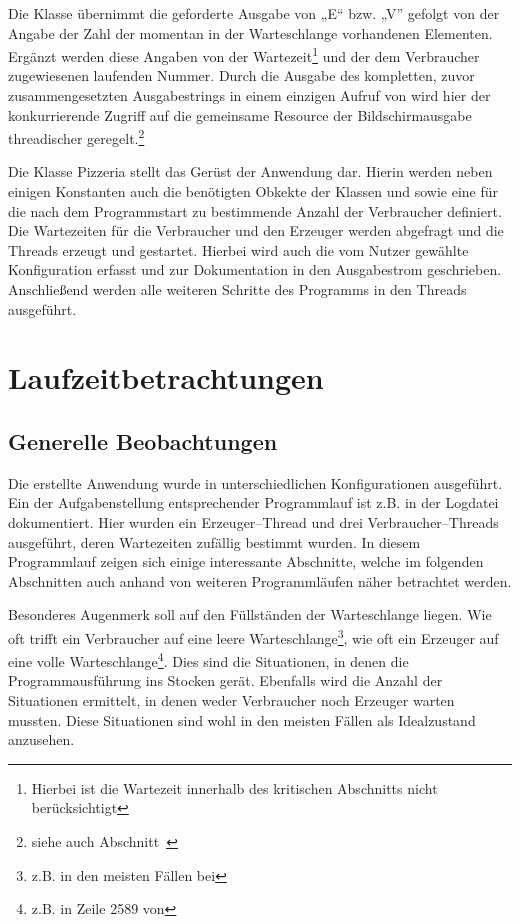 Die Klasse  übernimmt die geforderte Ausgabe von „E“ bzw. „V” gefolgt von der Angabe der Zahl der momentan in der Warteschlange vorhandenen Elementen. Ergänzt werden diese Angaben von der Wartezeit\footnote{Hierbei ist die Wartezeit innerhalb des kritischen Abschnitts nicht berücksichtigt} und der dem Verbraucher zugewiesenen laufenden Nummer. Durch die Ausgabe des kompletten, zuvor zusammengesetzten Ausgabestrings in einem einzigen Aufruf von  wird hier der konkurrierende Zugriff auf die gemeinsame Resource der Bildschirmausgabe threadischer geregelt.\footnote{siehe auch Abschnitt~}

Die Klasse Pizzeria stellt das Gerüst der Anwendung dar. Hierin werden neben einigen Konstanten auch die benötigten Obkekte der Klassen  und  sowie eine  für die nach dem Programmstart zu bestimmende Anzahl der Verbraucher definiert. Die Wartezeiten für die Verbraucher und den Erzeuger werden abgefragt und die Threads erzeugt und gestartet. Hierbei wird auch die vom Nutzer gewählte Konfiguration erfasst und zur Dokumentation in den Ausgabestrom geschrieben. Anschließend werden alle weiteren Schritte des Programms in den Threads ausgeführt. 

\section{Laufzeitbetrachtungen} %
\label{sec:laufzeitbetrachtungen}

\subsection{Generelle Beobachtungen} %
\label{sub:generelle_beobachtungen}
Die erstellte Anwendung wurde in unterschiedlichen Konfigurationen ausgeführt. Ein der Aufgabenstellung entsprechender Programmlauf ist z.B. in der Logdatei  dokumentiert. Hier wurden ein Erzeuger–Thread und drei Verbraucher–Threads ausgeführt, deren Wartezeiten zufällig bestimmt wurden. In diesem Programmlauf zeigen sich einige interessante Abschnitte, welche im folgenden Abschnitten auch anhand von weiteren Programmläufen näher betrachtet werden.

Besonderes Augenmerk soll auf den Füllständen der Warteschlange liegen. Wie oft trifft ein Verbraucher auf eine leere Warteschlange\footnote{z.B. in den meisten Fällen bei }, wie oft ein Erzeuger auf eine volle Warteschlange\footnote{z.B. in Zeile 2589 von }. Dies sind die Situationen, in denen die Programmausführung ins Stocken gerät. Ebenfalls wird die Anzahl der Situationen ermittelt, in denen weder Verbraucher noch Erzeuger warten mussten. Diese Situationen sind wohl in den meisten Fällen als Idealzustand anzusehen.

